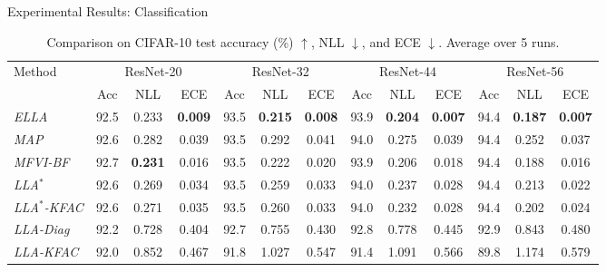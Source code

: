 \documentclass{beamer}
\begin{document}
\begin{frame}{Experimental Results: Classification}

\begin{table}[t]
  \centering
  \tiny
  \caption{Comparison on CIFAR-10 test accuracy (\%) $\uparrow$, NLL $\downarrow$, and ECE $\downarrow$. Average over 5 runs.}
  \vskip 0.05in
  \label{table:3}
  \setlength{\tabcolsep}{2.5pt}
  \begin{tabular}{lcccccccccccc}
  \toprule
  \multirow{2}{*}{Method} & \multicolumn{3}{c}{ResNet-20} & \multicolumn{3}{c}{ResNet-32} & \multicolumn{3}{c}{ResNet-44} & \multicolumn{3}{c}{ResNet-56} \\
  \cmidrule(lr){2-4} \cmidrule(lr){5-7} \cmidrule(lr){8-10} \cmidrule(l){11-13}
  & Acc & NLL & ECE & Acc & NLL & ECE & Acc & NLL & ECE & Acc & NLL & ECE \\
  \midrule
  
  \emph{ELLA}      & 92.5 & 0.233 & \textbf{0.009} & 93.5 & \textbf{0.215} & \textbf{0.008} & 93.9 & \textbf{0.204} & \textbf{0.007} & 94.4 & \textbf{0.187} & \textbf{0.007} \\
  \emph{MAP}       & 92.6 & 0.282 & 0.039 & 93.5 & 0.292 & 0.041 & 94.0 & 0.275 & 0.039 & 94.4 & 0.252 & 0.037 \\
  \emph{MFVI-BF}   & 92.7 & \textbf{0.231} & 0.016 & 93.5 & 0.222 & 0.020 & 93.9 & 0.206 & 0.018 & 94.4 & 0.188 & 0.016 \\
  \emph{LLA$^*$}   & 92.6 & 0.269 & 0.034 & 93.5 & 0.259 & 0.033 & 94.0 & 0.237 & 0.028 & 94.4 & 0.213 & 0.022 \\
  \emph{LLA$^*$-KFAC} & 92.6 & 0.271 & 0.035 & 93.5 & 0.260 & 0.033 & 94.0 & 0.232 & 0.028 & 94.4 & 0.202 & 0.024 \\
  \emph{LLA-Diag}  & 92.2 & 0.728 & 0.404 & 92.7 & 0.755 & 0.430 & 92.8 & 0.778 & 0.445 & 92.9 & 0.843 & 0.480 \\
  \emph{LLA-KFAC}  & 92.0 & 0.852 & 0.467 & 91.8 & 1.027 & 0.547 & 91.4 & 1.091 & 0.566 & 89.8 & 1.174 & 0.579 \\
  \bottomrule
  \end{tabular}
\end{table}


\end{frame}
\end{document}
